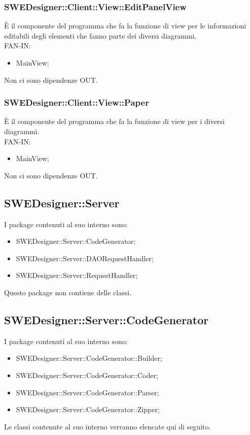 \documentclass[../PianoDiQualifica.tex]{subfiles}
\begin{document}
		\subsubsection{SWEDesigner::Client::View::EditPanelView}
		È il componente del programma che fa la funzione di view per le informazioni editabili degli elementi che fanno parte dei diversi diagrammi.\\
		FAN-IN:
		\begin{itemize}
			\item MainView;
		\end{itemize}
		Non ci sono dipendenze OUT.
		\subsubsection{SWEDesigner::Client::View::Paper}
		È il componente del programma che fa la funzione di view per i diversi diagrammi.\\
		FAN-IN:
		\begin{itemize}
			\item MainView;
		\end{itemize}
		Non ci sono dipendenze OUT.
		\subsection{SWEDesigner::Server}
		I package contenuti al suo interno sono:
		\begin{itemize}
			\item SWEDesigner::Server::CodeGenerator;
			\item SWEDesigner::Server::DAORequestHandler;
			\item SWEDesigner::Server::RequestHandler;
		\end{itemize}
		Questo package non contiene delle classi.
		\subsection{SWEDesigner::Server::CodeGenerator}
		I package contenuti al suo interno sono:
		\begin{itemize}
			\item SWEDesigner::Server::CodeGenerator::Builder;
			\item SWEDesigner::Server::CodeGenerator::Coder;
			\item SWEDesigner::Server::CodeGenerator::Parser;
			\item SWEDesigner::Server::CodeGenerator::Zipper;
		\end{itemize}
		Le classi contenute al suo interno verranno elencate qui di seguito.
\end{document}
